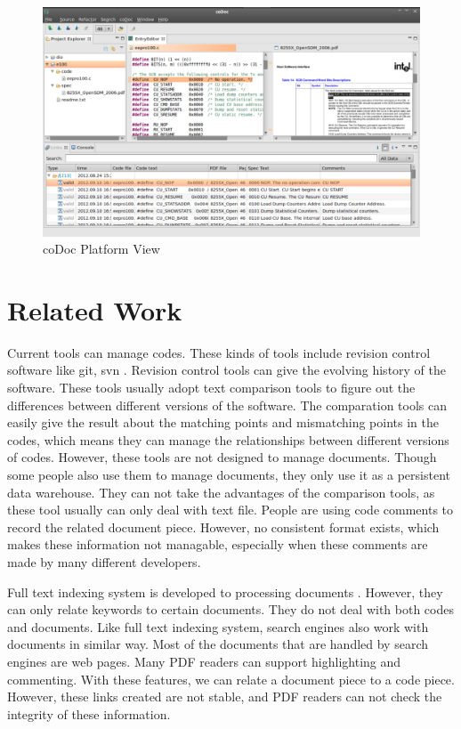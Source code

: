 \documentclass[runningheads,a4paper]{llncs}
\begin{document}
\begin{figure}
\begin{center}
\includegraphics[width=\textwidth]{platformview}
\caption{coDoc Platform View}
\label{fig:platformview}
\end{center}
\end{figure}


\section{Related Work}
\label{sec:related}
Current tools can manage codes. 
These kinds of tools include revision control software like git, svn \cite{git} \cite{svn}. 
Revision control tools can give the evolving history of the software.
These tools usually adopt text comparison tools to figure out the differences between different versions of the software.
The comparation tools can easily give the result about the matching points and mismatching points in the codes,
which means they can manage the relationships between different versions of codes.
However, these tools are not designed to manage documents.
Though some people also use them to manage documents,
they only use it as a persistent data warehouse.
They can not take the advantages of the comparison tools, 
as these tool usually can only deal with text file.
People are using code comments to record the related document piece.
However, no consistent format exists,
which makes these information not managable,
especially when these comments are made by many different developers.

Full text indexing system is developed to processing documents \cite{lucene}.
However, they can only relate keywords to certain documents.
They do not deal with both codes and documents. 
Like full text indexing system,
search engines also work with documents in similar way.
Most of the documents that are handled by search engines are web pages.
Many PDF readers can support highlighting and commenting.
With these features, we can relate a document piece to a code piece.
However, these links created are not stable,
and PDF readers can not check the integrity of these information.
\end{document}
